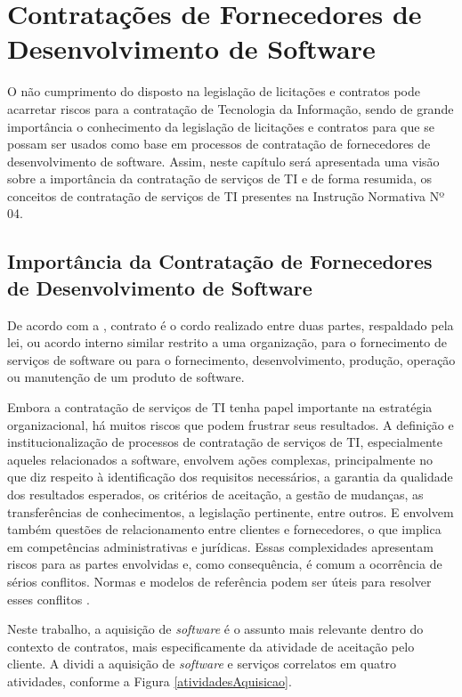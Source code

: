 \chapter{Contratações de Fornecedores de Desenvolvimento de Software}
\label{chap:contratos}

O não cumprimento do disposto na legislação de licitações e contratos pode acarretar riscos para a contratação de Tecnologia da Informação, sendo de grande importância o conhecimento da legislação de licitações e contratos para que se possam ser usados como base em processos de contratação de fornecedores de desenvolvimento de software.
Assim, neste capítulo será apresentada uma visão sobre a importância da contratação de
serviços de TI e de forma resumida, os conceitos de contratação de serviços de TI presentes na Instrução Normativa Nº 04.

\section{Importância da Contratação de Fornecedores de Desenvolvimento de Software}

De acordo com a , contrato é o cordo realizado entre duas partes, respaldado pela lei, ou acordo interno similar restrito a uma organização, para o fornecimento de serviços de software ou para o fornecimento, desenvolvimento, produção, operação ou manutenção de um produto de software.

Embora a contratação de serviços de TI tenha papel importante na estratégia organizacional, há muitos riscos que podem frustrar seus resultados. A definição e institucionalização de processos de contratação de serviços de TI, especialmente aqueles relacionados a software, envolvem ações complexas, principalmente no que diz respeito à identificação dos requisitos necessários, a garantia da qualidade dos resultados esperados, os critérios de aceitação, a gestão de mudanças, as transferências de conhecimentos, a legislação pertinente, entre outros. E envolvem também questões de relacionamento entre clientes e fornecedores, o que implica em competências administrativas e jurídicas. Essas complexidades apresentam riscos para as partes envolvidas e, como consequência, é comum a ocorrência de sérios conflitos. Normas e modelos de referência podem ser úteis para resolver esses conflitos \cite{processoContratacao}.

Neste trabalho, a aquisição de \textit{software} é o assunto mais relevante dentro do contexto de contratos,  mais especificamente da atividade de aceitação pelo cliente. A \cite{ISO:12207} dividi a aquisição de \textit{software} e serviços correlatos em quatro atividades, conforme a Figura \ref{atividadesAquisicao}.


